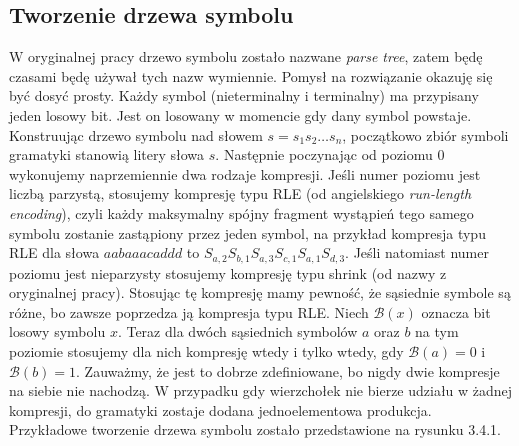 \documentclass[declaration,shortabstract]{iithesis}
\theoremstyle{definition} \newtheorem{definition}{Definicja}[chapter]
\theoremstyle{remark} \newtheorem{remark}[definition]{Obserwacja}
\theoremstyle{plain} \newtheorem{theorem}[definition]{Twierdzenie}
\theoremstyle{remark} \newtheorem{example}{Przykład}[definition]
\theoremstyle{plain} \newtheorem{lemma}[definition]{Lemat}
\begin{document}
\subsection{Tworzenie drzewa symbolu}

W oryginalnej pracy drzewo symbolu zostało nazwane \textit{parse tree}, zatem będę czasami będę używał tych nazw wymiennie. Pomysł na rozwiązanie okazuję się być dosyć prosty. Każdy symbol (nieterminalny i terminalny) ma przypisany jeden losowy bit. Jest on losowany w momencie gdy dany symbol powstaje. Konstruując drzewo symbolu nad słowem $s = s_1 s_2 \ldots s_n$, początkowo zbiór symboli gramatyki stanowią litery słowa $s$. Następnie poczynając od poziomu $0$ wykonujemy naprzemiennie dwa rodzaje kompresji. Jeśli numer poziomu jest liczbą parzystą, stosujemy kompresję typu RLE (od angielskiego \textit{run-length encoding}), czyli każdy maksymalny spójny fragment wystąpień tego samego symbolu zostanie zastąpiony przez jeden symbol, na przykład kompresja typu RLE dla słowa $aabaaacaddd$ to $S_{a, 2} S_{b, 1} S_{a, 3} S_{c, 1} S_{a, 1} S_{d, 3}$. Jeśli natomiast numer poziomu jest nieparzysty stosujemy kompresję typu shrink (od nazwy z oryginalnej pracy). Stosując tę kompresję mamy pewność, że sąsiednie symbole są różne, bo zawsze poprzedza ją kompresja typu RLE. Niech $\mathcal{B}(x)$ oznacza bit losowy symbolu $x$. Teraz dla dwóch sąsiednich symbolów $a$ oraz $b$ na tym poziomie stosujemy dla nich kompresję wtedy i tylko wtedy, gdy $\mathcal{B}(a) = 0$ i $\mathcal{B}(b) = 1$. Zauważmy, że jest to dobrze zdefiniowane, bo nigdy dwie kompresje na siebie nie nachodzą. W przypadku gdy wierzchołek nie bierze udziału w żadnej kompresji, do gramatyki zostaje dodana jednoelementowa produkcja. Przykładowe tworzenie drzewa symbolu zostało przedstawione na rysunku 3.4.1.
\end{document}
